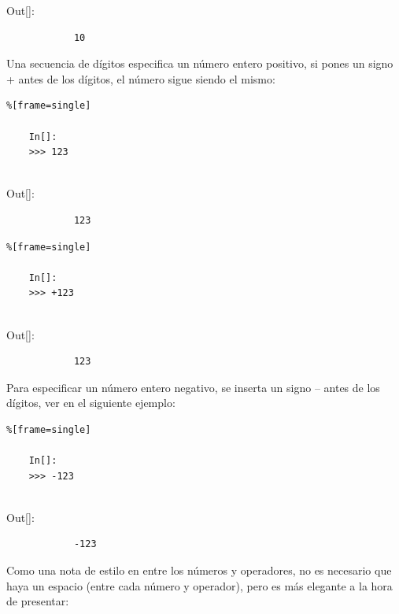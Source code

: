 {\ttfamily\scriptsize\scriptsize 
	\hspace{-0.65cm}Out[]:\vspace{-0.15cm}	
	{\color{blue} 	
		\begin{verbatim}
			10
		\end{verbatim}
}}

Una secuencia de dígitos especifica un número entero positivo, si pones un signo + antes de los dígitos, 
el número sigue siendo el mismo:

\begin{lstlisting}%[frame=single]
	
	In[]:
	>>> 123
	
\end{lstlisting}

{\ttfamily\scriptsize\scriptsize 
	\hspace{-0.65cm}Out[]:\vspace{-0.15cm}	
	{\color{blue} 	
		\begin{verbatim}
			123
		\end{verbatim}
}}


\begin{lstlisting}%[frame=single]
	
	In[]:
	>>> +123
	
\end{lstlisting}

{\ttfamily\scriptsize\scriptsize 
	\hspace{-0.65cm}Out[]:\vspace{-0.15cm}	
	{\color{blue} 	
		\begin{verbatim}
			123
		\end{verbatim}
}}


Para especificar un número entero negativo, se inserta un signo – antes de los dígitos, ver en el siguiente ejemplo:

\begin{lstlisting}%[frame=single]
	
	In[]:
	>>> -123
	
\end{lstlisting}

{\ttfamily\scriptsize\scriptsize 
	\hspace{-0.65cm}Out[]:\vspace{-0.15cm}	
	{\color{blue} 	
		\begin{verbatim}
			-123
		\end{verbatim}
}}


Como una nota de estilo en entre los números y operadores, no es necesario que haya un espacio (entre cada número y operador), pero es más elegante a la hora de presentar:


